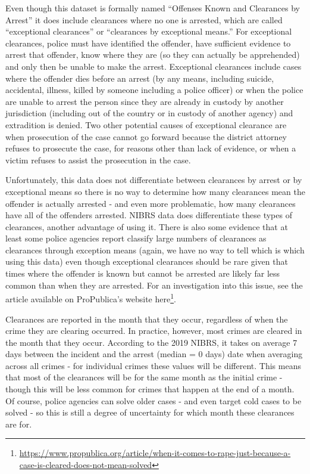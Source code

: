 \documentclass[
]{krantz}
\renewcommand{\href}[2]{#2\footnote{\url{#1}}}
\begin{document}
Even though this dataset is formally named ``Offenses Known
and Clearances by Arrest'' it does include clearances where
no one is arrested, which are called ``exceptional
clearances'' or ``clearances by exceptional means.'' For
exceptional clearances, police must have identified the
offender, have sufficient evidence to arrest that offender,
know where they are (so they can actually be apprehended)
and only then be unable to make the arrest. Exceptional
clearances include cases where the offender dies before an
arrest (by any means, including suicide, accidental,
illness, killed by someone including a police officer) or
when the police are unable to arrest the person since they
are already in custody by another jurisdiction (including
out of the country or in custody of another agency) and
extradition is denied. Two other potential causes of
exceptional clearance are when prosecution of the case
cannot go forward because the district attorney refuses to
prosecute the case, for reasons other than lack of evidence,
or when a victim refuses to assist the prosecution in the
case.

Unfortunately, this data does not differentiate between
clearances by arrest or by exceptional means so there is no
way to determine how many clearances mean the offender is
actually arrested - and even more problematic, how many
clearances have all of the offenders arrested. NIBRS data
does differentiate these types of clearances, another
advantage of using it. There is also some evidence that at
least some police agencies report classify large numbers of
clearances as clearances through exception means (again, we
have no way to tell which is which using this data) even
though exceptional clearances should be rare given that
times where the offender is known but cannot be arrested are
likely far less common than when they are arrested. For an
investigation into this issue, see the
\citet{yeung2018comes} article available on ProPublica's
website
\href{https://www.propublica.org/article/when-it-comes-to-rape-just-because-a-case-is-cleared-does-not-mean-solved}{here}.

Clearances are reported in the month that they occur,
regardless of when the crime they are clearing occurred. In
practice, however, most crimes are cleared in the month that
they occur. According to the 2019 NIBRS, it takes on average
7 days between the incident and the arrest (median = 0 days)
date when averaging across all crimes - for individual
crimes these values will be different. This means that most
of the clearances will be for the same month as the initial
crime - though this will be less common for crimes that
happen at the end of a month. Of course, police agencies can
solve older cases - and even target cold cases to be solved
- so this is still a degree of uncertainty for which month
these clearances are for.
\end{document}
